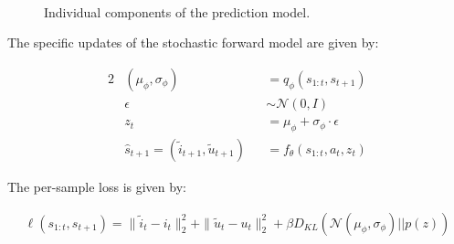 \documentclass{article} %
\begin{document}
\begin{figure}[t!]
    \centering
     \\
     \\
     \\
    \caption{Individual components of the prediction model.}
\end{figure}
\label{model-components}



The specific updates of the stochastic forward model are given by:

\begin{alignat}{2}
  \label{eq:update-eqn}
  &(\mu_\phi, \sigma_\phi) &&= q_\phi(s_{1:t}, s_{t+1}) \\
  &\epsilon &&\sim \mathcal{N}(0, I) \\
  &z_t &&= \mu_\phi + \sigma_\phi \cdot \epsilon \\
  &\hat{s}_{t+1} = (\tilde{i}_{t+1}, \tilde{u}_{t+1}) &&= f_\theta(s_{1:t}, a_t, z_t)
\end{alignat}

The per-sample loss is given by:

\begin{align}
  \label{eq:update-eqn}
  \ell(s_{1:t}, s_{t+1}) = \|\tilde{i}_t - i_t \|_2^2 + \| \tilde{u}_t - u_t \|_2^2 + \beta D_{KL}(\mathcal{N}(\mu_\phi, \sigma_\phi) || p(z))
\end{align}
\end{document}
